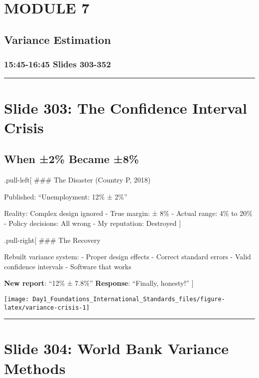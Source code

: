 \documentclass[
]{article}
\begin{document}
\section{MODULE 7}\label{module-7}

\subsection{Variance Estimation}\label{variance-estimation}

\subsubsection{15:45-16:45 \textbar{} Slides
303-352}\label{slides-303-352}

\begin{center}\rule{0.5\linewidth}{0.5pt}\end{center}

\section{Slide 303: The Confidence Interval
Crisis}\label{slide-303-the-confidence-interval-crisis}

\subsection{When ±2\% Became ±8\%}\label{when-2-became-8}

.pull-left{[} \#\#\# The Disaster (Country P, 2018)

Published: ``Unemployment: 12\% ± 2\%''

Reality: Complex design ignored - True margin: ± 8\% - Actual range: 4\%
to 20\% - Policy decisions: All wrong - My reputation: Destroyed {]}

.pull-right{[} \#\#\# The Recovery

Rebuilt variance system: - Proper design effects - Correct standard
errors - Valid confidence intervals - Software that works

\textbf{New report}: ``12\% ± 7.8\%'' \textbf{Response}: ``Finally,
honesty!'' {]}

\texttt{[image: Day1\_Foundations\_International\_Standards\_files/figure-latex/variance-crisis-1]}

\begin{center}\rule{0.5\linewidth}{0.5pt}\end{center}

\section{Slide 304: World Bank Variance
Methods}\label{slide-304-world-bank-variance-methods}
\end{document}
